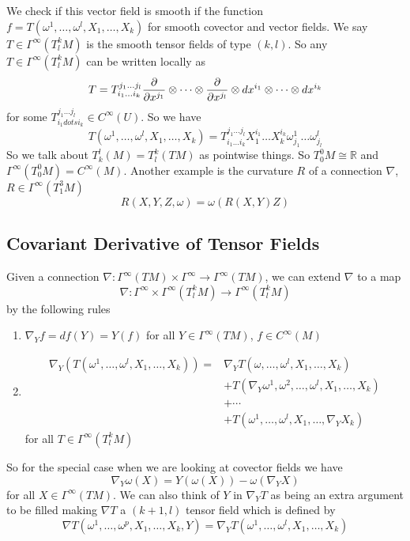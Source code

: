 \documentclass[a4paper]{article}
\begin{document}
We check if this vector field is smooth if the function $f = T(\omega^1, \dots, \omega^l, X_1, \dots, X_k)$ for smooth covector and vector fields. We say $T \in \Gamma^{\infty}(T_l^kM)$ is the smooth tensor fields of type $(k,l)$. So any $T \in \Gamma^{\infty}(T_l^kM)$ can be written locally as
\[
  T = T_{i_1 \dots i_k}^{j_1 \dots j_l} \pdv{x^{j_1} } \otimes \dots \otimes \pdv{x^{j_l}} \otimes dx^{i_1} \otimes \dots \otimes dx^{i_k} 
\]
for some $T_{i_1 dots i_k}^{j_1 \dots j_l} \in C^{\infty}(U)$. So we have
\[
  T(\omega^1, \dots, \omega^l, X_{1}, \dots, X_k) = T_{i_1 \dots i_k}^{j_1 \dots j_l} X_1^{i_1} \dots X_k^{i_k} \omega_{j_1}^1 \dots \omega_{j_l}^l
\]
So we talk about $T_k^l(M) = T_l^k(TM)$ as pointwise things. So $T_0^0 M \cong \mathds{R}$ and $\Gamma^{\infty}(T_0^0M) = C^{\infty}(M)$. Another example is the curvature $R$ of a connection $\nabla$, $R \in \Gamma^{\infty}(T_1^3M)$
\[
  R(X,Y,Z,\omega) = \omega(R(X,Y)Z)
\]

\subsection*{Covariant Derivative of Tensor Fields}%
Given a connection $\nabla: \Gamma^{\infty}(TM) \times \Gamma^{\infty} \rightarrow \Gamma^{\infty}(TM)$, we can extend $\nabla$ to a map
\[
  \nabla: \Gamma^{\infty} \times \Gamma^\infty(T_l^k M) \rightarrow \Gamma^\infty (T_l^k M)
\]
by the following rules
\begin{enumerate}
  \item $\nabla_Y f = df(Y) = Y(f)$ for all $Y \in \Gamma^\infty (TM)$, $f \in C^\infty(M)$
  \item 
    \[
      \begin{aligned}
        \nabla_Y(T(\omega^1, \dots, \omega^l, X_1, \dots, X_k)) =& \nabla_Y T(\omega, \dots, \omega^l, X_1, \dots, X_k) \\
      &+ T(\nabla_Y \omega^1, \omega^2, \dots, \omega^l, X_1, \dots, X_k) \\ 
      &+ \cdots \\
      &+ T(\omega^1, \dots, \omega^l, X_1, \dots, \nabla_Y X_k)
      \end{aligned}
  \]
  for all $T \in \Gamma^\infty(T_l^k M)$
\end{enumerate}
So for the special case when we are looking at covector fields we have
\[
  \nabla_Y \omega(X) = Y(\omega(X)) - \omega(\nabla_Y X)
\]
for all $X \in \Gamma^\infty(TM)$. We can also think of $Y$ in $\nabla_Y T$ as being an extra argument to be filled making $\nabla T$ a $(k+1, l)$ tensor field which is defined by
\[
  \nabla T(\omega^1, \dots, \omega^p, X_1, \dots, X_k, Y) = \nabla_Y T(\omega^1, \dots, \omega^l, X_1, \dots, X_k)
\]
\end{document}
